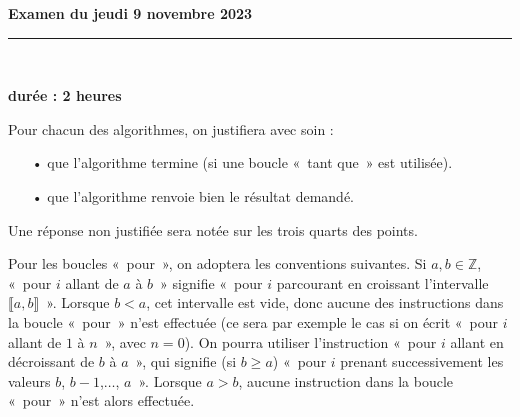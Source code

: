 \documentclass[11pt,a4paper]{article}
\title{}
\date{}
\newcommand{\HRule}{\rule{\linewidth}{0.5mm}}
\begin{document}
\pagestyle{fancy}

\fancyhead{}
 \fancyfoot{}


\newcommand{\lb}{\llbracket}
\newcommand{\rb}{\rrbracket}
\newcommand{\N}{\mathbb{N}}
\newcommand{\Z}{\mathbb{Z}}
\newcommand{\R}{\mathbb{R}}




\newcommand{\md}[3]{#1\ \equiv \ #2 \! \! \! \! \! \pmod {#3} }
\newcommand{\nmd}[3]{#1 \not \equiv #2 \! \! \! \! \!  \pmod {#3} }
\newcommand{\mda}[3]{#1 \equiv #2 \! \!  \pmod {#3} }
\newcommand{\nmda}[3]{#1 \not \equiv #2 \! \! \pmod {#3} }
\newcommand{\mo}[2]{#1 \! \! \! \! \! \pmod #2 }
\newcommand{\moa}[2]{#1 \! \!  \pmod {#2} }

\thispagestyle{fancy}

\begin{center}
    { \huge \bfseries
Examen du jeudi 9 novembre 2023
     \\ [0cm] }
    \HRule \\[0.5cm]
\end{center}

\begin{center}
\textbf{durée : 2 heures}
\end{center}



Pour chacun des algorithmes, on justifiera avec soin : \begin{itemize}
\item[•] que l'algorithme termine (si une boucle «~tant que~» est utilisée).

\item[•] que l'algorithme renvoie bien le résultat demandé.
\end{itemize}

Une réponse non justifiée sera notée sur les trois quarts des points.


\bigskip

Pour les boucles «~pour~», on adoptera les conventions suivantes. Si $a,b\in \Z$, «~pour $i$ allant de $a$ à $b$~» signifie «~pour $i$ parcourant en croissant l'intervalle $\llbracket a,b\rrbracket$~». Lorsque $b<a$, cet intervalle est vide, donc aucune des instructions dans la boucle «~pour~» n'est effectuée (ce sera par exemple le cas si on écrit «~pour $i$ allant de $1$ à $n$~», avec $n=0$). 
On pourra utiliser l'instruction «~pour $i$ allant en décroissant de $b$ à $a$~», qui signifie (si $b\geq a$) «~pour $i$ prenant successivement les valeurs $b$, $b-1$,$\ldots$, $a$~». Lorsque $a>b$, aucune instruction dans la boucle «~pour~» n'est alors effectuée.
\end{document}
